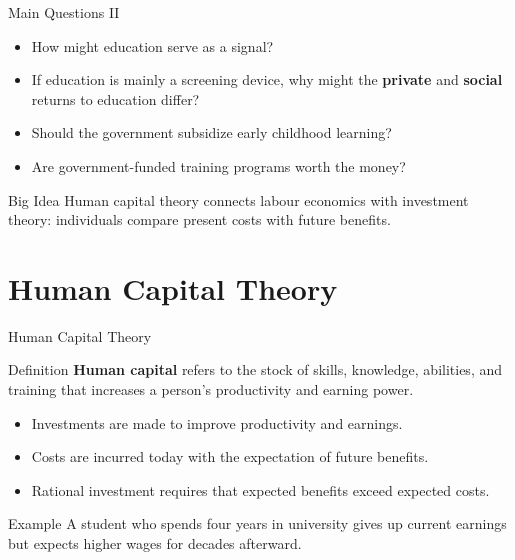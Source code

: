 \documentclass[aspectratio=169]{beamer}
\begin{document}
\begin{frame}{Main Questions II}
\transfade
\begin{itemize}
  \item How might education serve as a signal?
  \item If education is mainly a screening device, why might the \textbf{private} and \textbf{social} returns to education differ?
  \item Should the government subsidize early childhood learning?
  \item Are government-funded training programs worth the money?
\end{itemize}

\begin{block}{Big Idea}
Human capital theory connects labour economics with investment theory: individuals compare present costs with future benefits.
\end{block}
\end{frame}

\section{Human Capital Theory}

\begin{frame}{Human Capital Theory}
\transfade
\begin{block}{Definition}
\textbf{Human capital} refers to the stock of skills, knowledge, abilities, and training that increases a person's productivity and earning power.
\end{block}
\begin{itemize}
  \item Investments are made to improve productivity and earnings.
  \item Costs are incurred today with the expectation of future benefits.
  \item Rational investment requires that expected benefits exceed expected costs.
\end{itemize}

\begin{exampleblock}{Example}
A student who spends four years in university gives up current earnings but expects higher wages for decades afterward.
\end{exampleblock}
\end{frame}
\end{document}
